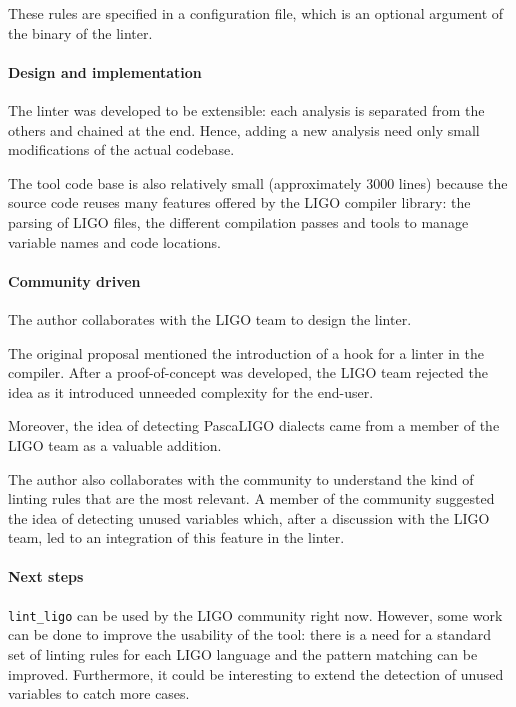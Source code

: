 \documentclass[10pt,a4paper]{article}
\begin{document}
These rules are specified in a configuration file, which is an optional argument
of the binary of the linter.

\paragraph{Design and implementation}

The linter was developed to be extensible: each analysis is separated from the others
and chained at the end. Hence, adding a new analysis need only small modifications of
the actual codebase.

The tool code base is also relatively small (approximately 3000 lines) because the source code
reuses many features offered by the LIGO compiler library: the parsing of LIGO files, the different
compilation passes and tools to manage variable names and code locations.

\paragraph{Community driven}

The author collaborates with the LIGO team to design the linter.

The original proposal mentioned the introduction of a hook for a
linter in the compiler. After a proof-of-concept was developed, the
LIGO team rejected the idea as it introduced unneeded complexity for
the end-user.

Moreover, the idea of detecting PascaLIGO dialects came from a member
of the LIGO team as a valuable addition.

The author also collaborates with the community to understand the kind
of linting rules that are the most relevant. A member of the community
suggested the idea of detecting unused variables which, after a
discussion with the LIGO team, led to an integration of this feature
in the linter.

\paragraph{Next steps}

\verb|lint_ligo| can be used by the LIGO community right now.
However, some work can be done to improve the usability of the tool:
there is a need for a standard set of linting rules for each LIGO
language and the pattern matching can be improved. Furthermore, it
could be interesting to extend the detection of unused variables to
catch more cases.
\end{document}
